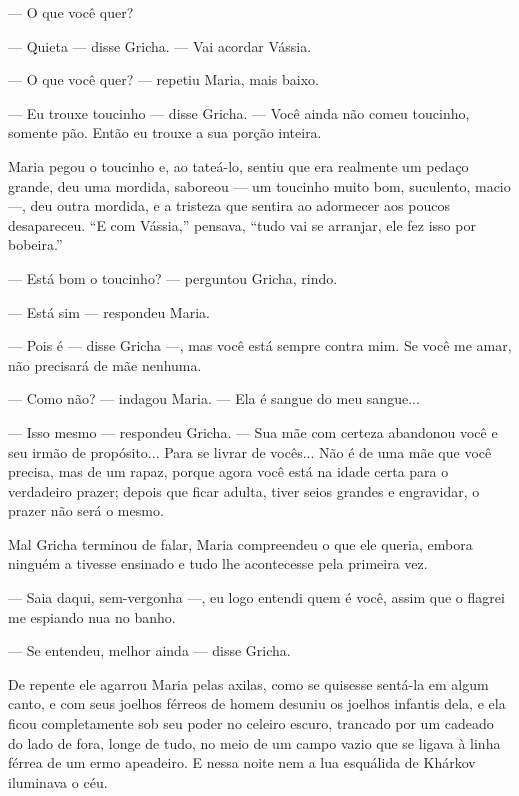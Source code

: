 --- O que você quer?

--- Quieta --- disse Gricha. --- Vai acordar Vássia.

--- O que você quer? --- repetiu Maria, mais baixo.

--- Eu trouxe toucinho --- disse Gricha. --- Você ainda não comeu
toucinho, somente pão. Então eu trouxe a sua porção inteira.

Maria pegou o toucinho e, ao tateá-lo, sentiu que era realmente um
pedaço grande, deu uma mordida, saboreou --- um toucinho muito bom,
suculento, macio ---, deu outra mordida, e a tristeza que sentira ao
adormecer aos poucos desapareceu. ``E com Vássia,'' pensava, ``tudo vai
se arranjar, ele fez isso por bobeira.''

--- Está bom o toucinho? --- perguntou Gricha, rindo.

--- Está sim --- respondeu Maria.

--- Pois é --- disse Gricha ---, mas você está sempre contra mim. Se
você me amar, não precisará de mãe nenhuma.

--- Como não? --- indagou Maria. --- Ela é sangue do meu sangue...

--- Isso mesmo --- respondeu Gricha. --- Sua mãe com certeza abandonou
você e seu irmão de propósito... Para se livrar de vocês... Não é de uma
mãe que você precisa, mas de um rapaz, porque agora você está na idade
certa para o verdadeiro prazer; depois que ficar adulta, tiver seios
grandes e engravidar, o prazer não será o mesmo.

Mal Gricha terminou de falar, Maria compreendeu o que ele queria, embora
ninguém a tivesse ensinado e tudo lhe acontecesse pela primeira vez.

--- Saia daqui, sem-vergonha ---, eu logo entendi quem é você, assim que
o flagrei me espiando nua no banho.

--- Se entendeu, melhor ainda --- disse Gricha.

De repente ele agarrou Maria pelas axilas, como se quisesse sentá-la em
algum canto, e com seus joelhos férreos de homem desuniu os joelhos
infantis dela, e ela ficou completamente sob seu poder no celeiro
escuro, trancado por um cadeado do lado de fora, longe de tudo, no meio
de um campo vazio que se ligava à linha férrea de um ermo apeadeiro. E
nessa noite nem a lua esquálida de Khárkov iluminava o céu.

